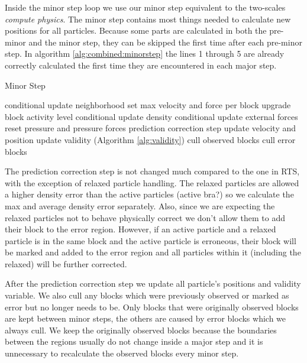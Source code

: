 \documentclass[../../main.tex]{subfiles}
\begin{document}
Inside the minor step loop we use our minor step equivalent to the two-scales \textit{compute physics}. The minor step contains most things needed to calculate new positions for all particles. Because some parts are calculated in both the pre-minor and the minor step, they can be skipped the first time after each pre-minor step. In algorithm \ref{alg:combined:minorstep} the lines 1 through 5 are already correctly calculated the first time they are encountered in each major step. 

\begin{algorithm}[h]
    \caption{Minor Step}
    \label{alg:combined:minorstep}
    \begin{algorithmic}[1]
    \State conditional update neighborhood 
    \State set max velocity and force per block
    \State upgrade block activity level
    \State conditional update density 
    \State conditional update external forces 
    \State reset pressure and pressure forces
    \State prediction correction step
    \State update velocity and position
    \State update validity (Algorithm \ref{alg:validity})
    \State cull observed blocks
	\State cull error blocks
   \end{algorithmic}
\end{algorithm}

The prediction correction step is not changed much compared to the one in RTS, with the exception of relaxed particle handling. The relaxed particles are allowed a higher density error than the active particles (active bra?) so we calculate the max and average density error separately. Also, since we are expecting the relaxed particles not to behave physically correct we don't allow them to add their block to the error region. However, if an active particle and a relaxed particle is in the same block and the active particle is erroneous, their block will be marked and added to the error region and all particles within it (including the relaxed) will be further corrected. 

After the prediction correction step we update all particle's positions and validity variable. We also cull any blocks which were previously observed or marked as error but no longer needs to be. Only blocks that were originally observed blocks are kept between minor steps, the others are caused by error blocks which we always cull. We keep the originally observed blocks because the boundaries between the regions usually do not change inside a major step and it is unnecessary to recalculate the observed blocks every minor step. 
\end{document}
